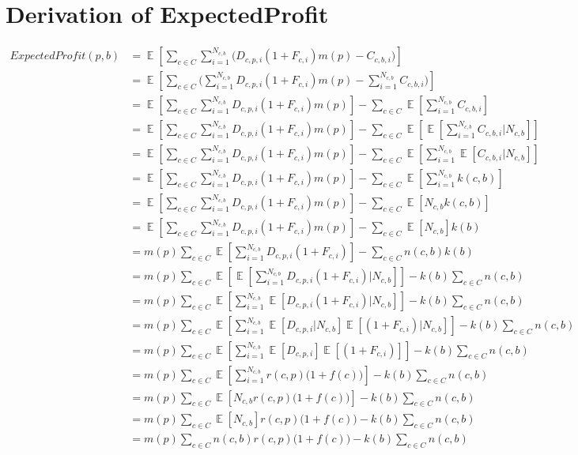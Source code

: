 \documentclass[11pt]{article} %
\DeclareMathOperator{\EX}{\mathbb{E}}
\begin{document}
\section{Derivation of ExpectedProfit}\label{sec.DerExpProf}
\begin{align*}
ExpectedProfit(p,b) 
&= \EX\left[\sum_{c \in C}{\sum_{i =1}^{N_{c,b}}{\bigg( D_{c,p,i}(1+F_{c,i})m(p)-C_{c,b,i}\bigg)}}\right]\\
&= \EX\left[\sum_{c \in C}{\bigg(\sum_{i =1}^{N_{c,b}}{ D_{c,p,i}(1+F_{c,i})m(p)}-\sum_{i =1}^{N_{c,b}}C_{c,b,i}\bigg)}\right]\\
&= \EX\left[\sum_{c \in C}{\sum_{i =1}^{N_{c,b}}{ D_{c,p,i}(1+F_{c,i})m(p)}}\right]-\sum_{c \in C}{\EX\left[\sum_{i =1}^{N_{c,b}}C_{c,b,i}\right]}\\
&= \EX\left[\sum_{c \in C}{\sum_{i =1}^{N_{c,b}}{ D_{c,p,i}(1+F_{c,i})m(p)}}\right]-\sum_{c \in C}{\EX\left[\EX\left[\sum_{i =1}^{N_{c,b}}C_{c,b,i}\bigg|N_{c,b}\right]\right]}\\
&= \EX\left[\sum_{c \in C}{\sum_{i =1}^{N_{c,b}}{ D_{c,p,i}(1+F_{c,i})m(p)}}\right]-\sum_{c \in C}{\EX\left[\sum_{i =1}^{N_{c,b}}\EX\left[C_{c,b,i}\bigg|N_{c,b}\right]\right]}\\
&= \EX\left[\sum_{c \in C}{\sum_{i =1}^{N_{c,b}}{ D_{c,p,i}(1+F_{c,i})m(p)}}\right]-\sum_{c \in C}{\EX\left[\sum_{i =1}^{N_{c,b}}k(c,b)\right]}\\
&= \EX\left[\sum_{c \in C}{\sum_{i =1}^{N_{c,b}}{ D_{c,p,i}(1+F_{c,i})m(p)}}\right]-\sum_{c \in C}{\EX\left[N_{c,b}k(c,b)\right]}\\
&= \EX\left[\sum_{c \in C}{\sum_{i =1}^{N_{c,b}}{ D_{c,p,i}(1+F_{c,i})m(p)}}\right]-\sum_{c \in C}{\EX[N_{c,b}]k(b)}\\
&= m(p)\sum_{c \in C}{\EX\left[\sum_{i =1}^{N_{c,b}}{ D_{c,p,i}(1+F_{c,i})}\right]}-\sum_{c \in C}{n(c,b)k(b)}\\
&= m(p)\sum_{c \in C}{\EX\left[\EX\left[\sum_{i =1}^{N_{c,b}}{ D_{c,p,i}(1+F_{c,i})}\Bigg|N_{c,b}\right]\right]}-k(b)\sum_{c \in C}{n(c,b)}\\
&= m(p)\sum_{c \in C}{\EX\left[\sum_{i =1}^{N_{c,b}}{\EX\left[D_{c,p,i}(1+F_{c,i})\bigg|N_{c,b}\right]}\right]}-k(b)\sum_{c \in C}{n(c,b)}\\
&= m(p)\sum_{c \in C}{\EX\left[\sum_{i =1}^{N_{c,b}}{\EX\left[D_{c,p,i}\bigg|N_{c,b}\right]\EX\left[(1+F_{c,i})\bigg|N_{c,b}\right]}\right]}-k(b)\sum_{c \in C}{n(c,b)}\\
&= m(p)\sum_{c \in C}{\EX\left[\sum_{i =1}^{N_{c,b}}{\EX\left[D_{c,p,i}\right]\EX\left[(1+F_{c,i})\right]}\right]}-k(b)\sum_{c \in C}{n(c,b)}\\
&= m(p)\sum_{c \in C}{\EX\left[\sum_{i =1}^{N_{c,b}}{r(c,p)\Big(1+f(c)\Big)}\right]}-k(b)\sum_{c \in C}{n(c,b)}\\
&= m(p)\sum_{c \in C}{\EX\left[N_{c,b}r(c,p)\Big(1+f(c)\Big)\right]}-k(b)\sum_{c \in C}{n(c,b)}\\
&= m(p)\sum_{c \in C}{\EX\left[N_{c,b}\right]r(c,p)\Big(1+f(c)\Big)}-k(b)\sum_{c \in C}{n(c,b)}\\
&= m(p)\sum_{c \in C}{n(c,b)r(c,p)\Big(1+f(c)\Big)}-k(b)\sum_{c \in C}{n(c,b)}
\end{align*}
\end{document}
